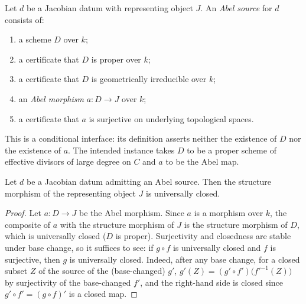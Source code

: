 \begin{definition}
  \label{def:abel_source}
  \leanok
  Let \(d\) be a Jacobian datum with representing object \(J\). An
  \emph{Abel source} for \(d\) consists of:
  \begin{enumerate}
    \item a scheme \(D\) over \(k\);
    \item a certificate that \(D\) is proper over \(k\);
    \item a certificate that \(D\) is geometrically irreducible over \(k\);
    \item an \emph{Abel morphism} \(a : D \to J\) over \(k\);
    \item a certificate that \(a\) is surjective on underlying topological
      spaces.
  \end{enumerate}
  This is a conditional interface: its definition asserts neither the
  existence of \(D\) nor the existence of \(a\). The intended instance takes
  \(D\) to be a proper scheme of effective divisors of large degree on \(C\)
  and \(a\) to be the Abel map.
\end{definition}

\begin{theorem}
  \label{thm:jacobianData_universallyClosed}
  \leanok
  Let \(d\) be a Jacobian datum admitting an Abel source. Then the structure
  morphism of the representing object \(J\) is universally closed.
\end{theorem}
\begin{proof}
  \leanok
  Let \(a : D \to J\) be the Abel morphism. Since \(a\) is a morphism over
  \(k\), the composite of \(a\) with the structure morphism of \(J\) is the
  structure morphism of \(D\), which is universally closed (\(D\) is proper).
  Surjectivity and closedness are stable under base change, so it suffices to
  see: if \(g \circ f\) is universally closed and \(f\) is surjective, then
  \(g\) is universally closed. Indeed, after any base change, for a closed
  subset \(Z\) of the source of the (base-changed) \(g'\),
  \(g'(Z) = (g' \circ f')\bigl(f'^{-1}(Z)\bigr)\) by surjectivity of the
  base-changed \(f'\), and the right-hand side is closed since
  \(g' \circ f' = (g \circ f)'\) is a closed map.
\end{proof}

